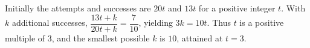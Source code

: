 Initially the attempts and successes are $20t$ and $13t$ for a positive integer $t$. With $k$ additional successes, $\dfrac{13t+k}{20t+k}=\dfrac{7}{10}$, yielding $3k=10t$. Thus $t$ is a positive multiple of $3$, and the smallest possible $k$ is $\boxed{10}$, attained at $t=3$.
